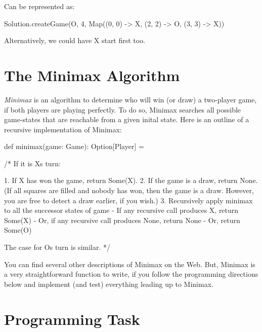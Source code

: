 \documentclass[9pt]{extbook}
\begin{document}
\begin{itemize}

Can be represented as:
\begin{scalacode}
Solution.createGame(O, 4, Map((0, 0) -> X, (2, 2) -> O, (3, 3) -> X))
\end{scalacode}
Alternatively, we could have X start first too.

\end{itemize}

\section{The Minimax Algorithm}

\emph{Minimax} is an algorithm to determine who will win (or draw)
a two-player game, if both players are playing perfectly. To do so, Minimax
searches all possible game-states that are reachable from a given inital
state. Here is an outline of a recursive implementation of Minimax:

\begin{scalacode}
def minimax(game: Game): Option[Player] = {

  /*
  If it is Xs turn:

    1. If X has won the game, return Some(X).
    2. If the game is a draw, return None. (If all squares are filled
       and nobody has won, then the game is a draw. However, you are
       free to detect a draw earlier, if you wish.)
    3. Recursively apply minimax to all the successor states of game
       - If any recursive call produces X, return Some(X)
       - Or, if any recursive call produces None, return None
       - Or, return Some(O)

  The case for Os turn is similar.
  */

}
\end{scalacode}

You can find several other descriptions of Minimax on the Web. But, Minimax
 is a very straightforward function to write, if you follow the programming directions below
and implement (and test) everything leading up to Minimax.

\section{Programming Task}
\end{document}

